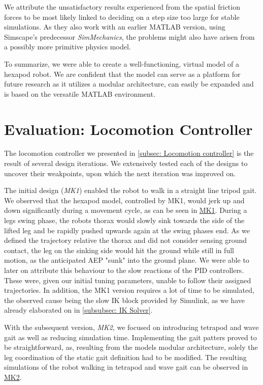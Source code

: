 We attribute the unsatisfactory results \cite{thilderkvist2015motion} experienced from the spatial friction forces to be most likely linked to deciding on a step size too large for stable simulations.
As they also work with an earlier MATLAB version, using Simscape's predecessor \textit{SimMechanics}, the problems might also have arisen from a possibly more primitive physics model.

To summarize, we were able to create a well-functioning, virtual model of a hexapod robot.
We are confident that the model can serve as a platform for future research as it utilizes a modular architecture, can easily be expanded and is based on the versatile MATLAB environment.
 

\section{Evaluation: Locomotion Controller}
The locomotion controller we presented in \ref{subsec: Locomotion controller} is the result of several design iterations.
We extensively tested each of the designs to uncover their weakpoints, upon which the next iteration was improved on.

The initial design (\textit{MK1}) enabled the robot to walk in a straight line tripod gait.
We observed that the hexapod model, controlled by MK1, would jerk up and down significantly during a movement cycle, as can be seen in \hyperref[vid: MK1]{MK1}.
During a legs swing phase, the robots thorax would slowly sink towards the side of the lifted leg and be rapidly pushed upwards again at the swing phases end.
As we defined the trajectory relative the thorax and did not consider sensing ground contact, the leg on the sinking side would hit the ground while still in full motion, as the anticipated AEP "sunk" into the ground plane.
We were able to later on attribute this behaviour to the slow reactions of the PID controllers.
These were, given our initial tuning parameters, unable to follow their assigned trajectories. 
In addition, the MK1 version requires a lot of time to be simulated, the observed cause being the slow IK block provided by Simulink, as we have already elaborated on in \ref{subsubsec: IK Solver}.

With the subsequent version, \textit{MK2}, we focused on introducing tetrapod and wave gait as well as reducing simulation time.
Implementing the gait patters proved to be straightforward, as, resulting from the models modular architecture, solely the leg coordination of the static gait definition had to be modified.
The resulting simulations of the robot walking in tetrapod and wave gait can be observed in \hyperref[vid: MK1]{MK2}.

